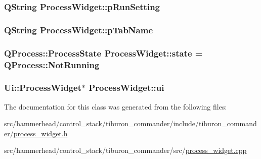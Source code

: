 \subsubsection[{\texorpdfstring{p\+Run\+Setting}{pRunSetting}}]{\setlength{\rightskip}{0pt plus 5cm}Q\+String Process\+Widget\+::p\+Run\+Setting}\hypertarget{classProcessWidget_a78ee040355ce578865206d6a2a908510}{}\label{classProcessWidget_a78ee040355ce578865206d6a2a908510}
\subsubsection[{\texorpdfstring{p\+Tab\+Name}{pTabName}}]{\setlength{\rightskip}{0pt plus 5cm}Q\+String Process\+Widget\+::p\+Tab\+Name}\hypertarget{classProcessWidget_a6090de412650269c0d44c12b3ab4e703}{}\label{classProcessWidget_a6090de412650269c0d44c12b3ab4e703}
\subsubsection[{\texorpdfstring{state}{state}}]{\setlength{\rightskip}{0pt plus 5cm}Q\+Process\+::\+Process\+State Process\+Widget\+::state = Q\+Process\+::\+Not\+Running\hspace{0.3cm}{\ttfamily [private]}}\hypertarget{classProcessWidget_a7999f134191b91a86a8f241706c80ca1}{}\label{classProcessWidget_a7999f134191b91a86a8f241706c80ca1}
\subsubsection[{\texorpdfstring{ui}{ui}}]{\setlength{\rightskip}{0pt plus 5cm}Ui\+::\+Process\+Widget$\ast$ Process\+Widget\+::ui\hspace{0.3cm}{\ttfamily [private]}}\hypertarget{classProcessWidget_a6ed6d8fb5b1ddbe9e02ab952e13d7f56}{}\label{classProcessWidget_a6ed6d8fb5b1ddbe9e02ab952e13d7f56}


The documentation for this class was generated from the following files\+:\begin{DoxyCompactItemize}
\item 
src/hammerhead/control\+\_\+stack/tiburon\+\_\+commander/include/tiburon\+\_\+commander/\hyperlink{process__widget_8h}{process\+\_\+widget.\+h}\item 
src/hammerhead/control\+\_\+stack/tiburon\+\_\+commander/src/\hyperlink{process__widget_8cpp}{process\+\_\+widget.\+cpp}\end{DoxyCompactItemize}

